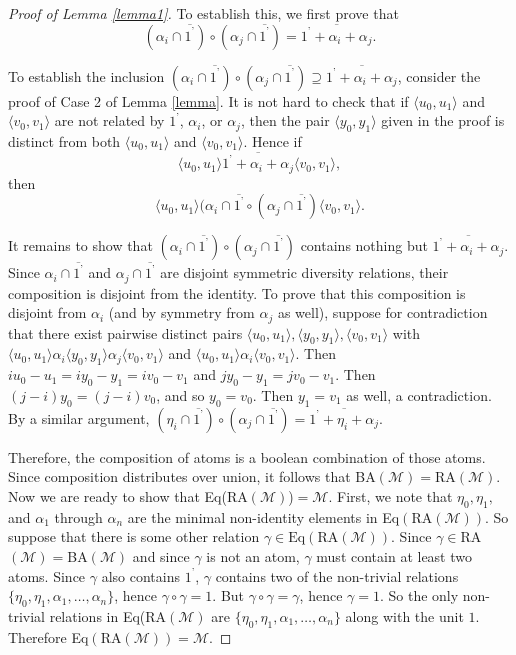 \documentclass[12pt]{au}
\begin{document}
\begin{proof}[Proof  of Lemma \ref{lemma1}]
   To establish this, we first prove that $$(\alpha_i\cap \overline{1^\text{'}})\circ(\alpha_j\cap\overline{1^\text{'}})=\overline{{1^\text{'}}+\alpha_i+\alpha_j}.  $$

    
To establish the inclusion $(\alpha_i\cap\overline{1^\text{'}})\circ(\alpha_j\cap\overline{1^\text{'}})\supseteq\overline{{1^\text{'}}+\alpha_i+\alpha_j}$, consider the proof of Case 2 of Lemma \ref{lemma}.  It is not hard to check that if $\langle u_0,u_1\rangle$ and $\langle v_0,v_1\rangle$ are not related by ${1^\text{'}}$, $\alpha_i$, or $\alpha_j$, then the pair $\langle y_0,y_1\rangle$ given in the proof is distinct from both $\langle u_0,u_1\rangle$ and $\langle v_0,v_1\rangle$.  Hence if
$$\langle u_0,u_1\rangle\overline{{1^\text{'}} +\alpha_i+\alpha_j}\langle v_0,v_1\rangle,$$
then $$\langle u_0,u_1\rangle(\alpha_i\cap\overline{1^\text{'}}\circ(\alpha_j\cap\overline{1^\text{'}})\langle v_0,v_1\rangle.$$

     It remains to show that $(\alpha_i\cap\overline{1^\text{'}})\circ(\alpha_j\cap\overline{1^\text{'}})$ contains nothing but $\overline{{1^\text{'}}+\alpha_i+\alpha_j}$.  Since $\alpha_i\cap\overline{1^\text{'}}$ and $\alpha_j\cap\overline{1^\text{'}}$ are  disjoint symmetric diversity relations, their composition is disjoint from the identity.  To prove that this composition is disjoint from $\alpha_i$ (and by symmetry from $\alpha_j$ as well), suppose for contradiction that there exist pairwise distinct pairs $\langle u_0,u_1\rangle,\langle y_0,y_1\rangle,\langle v_0,v_1\rangle$ with $\langle u_0,u_1\rangle\alpha_i\langle y_0,y_1\rangle\alpha_j\langle v_0,v_1\rangle$ and $\langle u_0,u_1\rangle\alpha_i\langle v_0,v_1\rangle$.  Then $iu_0-u_1=iy_0-y_1=iv_0-v_1$ and $jy_0-y_1=jv_0-v_1$.  Then $(j-i)y_0=(j-i)v_0$, and so $y_0=v_0$.  Then $y_1=v_1$ as well, a contradiction.  By a similar argument,
  $(\eta_i\cap\overline{1^\text{'}})\circ(\alpha_j\cap\overline{1^\text{'}})=\overline{{1^\text{'}}+\eta_i+\alpha_j}$.

 

 Therefore, the composition of atoms is a boolean combination of those atoms.  Since composition distributes over union, it follows that BA$(\mathcal{M})=\text{RA}(\mathcal{M})$.\\

  Now we are ready to show that Eq(RA$(\mathcal{M})$)$=\mathcal{M}$.  First, we note that $\eta_0,\eta_1,$ and $\alpha_1$ through $\alpha_{n}$ are the minimal non-identity elements in Eq$(\text{RA}(\mathcal{M}))$.  So suppose that there is some other relation $\gamma\in \text{Eq}(\text{RA}(\mathcal{M}))$.  Since  $\gamma\in$RA$(\mathcal{M})=$BA$(\mathcal{M})$ and since $\gamma$ is not an atom, $\gamma$ must contain  at least two atoms. Since $\gamma$ also contains ${1^\text{'}}$, $\gamma$ contains two of the non-trivial relations $\{\eta_0,\eta_1,\alpha_1,\ldots,\alpha_{n}\}$, hence $\gamma\circ \gamma=1$.  But $\gamma\circ \gamma=\gamma$, hence $\gamma=1$.  So the only non-trivial relations in Eq(RA$(\mathcal{M})$ are $\{\eta_0,\eta_1,\alpha_1,\ldots,\alpha_{n}\}$ along with the unit $1$. Therefore Eq$(\text{RA}(\mathcal{M}))=\mathcal{M}$.
\end{proof}
\end{document}
